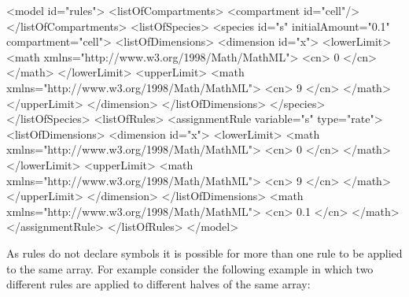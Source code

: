 \documentclass{cekarticle}
\begin{document}
\begin{example}
<model id="rules">
    <listOfCompartments>
        <compartment id="cell"/>
    </listOfCompartments>
    <listOfSpecies>
        <species id="s" initialAmount="0.1" compartment="cell">
            <listOfDimensions>
                <dimension id="x">
                    <lowerLimit>
                        <math xmlns="http://www.w3.org/1998/Math/MathML">
                            <cn> 0 </cn>
                        </math>
                    </lowerLimit>
                    <upperLimit>
                        <math xmlns="http://www.w3.org/1998/Math/MathML">
                            <cn> 9 </cn>
                        </math>
                    </upperLimit>
                </dimension>
            </listOfDimensions>
        </species>
    </listOfSpecies>
    <listOfRules>
        <assignmentRule variable="s" type="rate">
            <listOfDimensions>
                <dimension id="x">
                    <lowerLimit>
                        <math xmlns="http://www.w3.org/1998/Math/MathML">
                            <cn> 0 </cn>
                        </math>
                    </lowerLimit>
                    <upperLimit>
                        <math xmlns="http://www.w3.org/1998/Math/MathML">
                            <cn> 9 </cn>
                        </math>
                    </upperLimit>
                </dimension>
            </listOfDimensions>
            <math xmlns="http://www.w3.org/1998/Math/MathML">
                <cn> 0.1 </cn>
            </math>
        </assignmentRule>
    </listOfRules>
</model>
\end{example}

As rules do not declare symbols it is possible for more than one
rule to be applied to the same array. For example consider the
following example in which two different rules are applied to different halves of the
same array:
\end{document}
